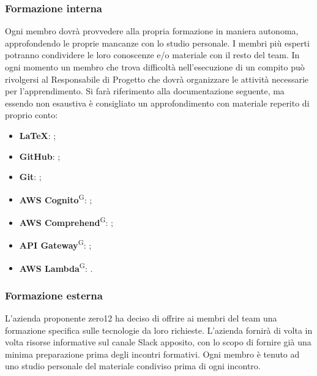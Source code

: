 \subsubsection{Formazione interna}
Ogni membro dovrà provvedere alla propria formazione in maniera autonoma, approfondendo le proprie mancanze con lo studio personale. I membri più esperti potranno condividere le loro conoscenze e/o materiale con il resto del team. In ogni momento un membro che trova difficoltà nell'esecuzione di un compito può rivolgersi al Responsabile di Progetto che dovrà organizzare le attività necessarie per l'apprendimento. Si farà riferimento alla documentazione seguente, ma essendo non esaustiva è consigliato un approfondimento con materiale reperito di proprio conto:
\begin{itemize}
\item \textbf{\LaTeX}: ;
\item \textbf{GitHub}: ;
\item \textbf{Git}: ;
\item \textbf{AWS Cognito}\textsuperscript{G}: ;
\item \textbf{AWS Comprehend}\textsuperscript{G}: ;
\item \textbf{API Gateway}\textsuperscript{G}: ;
\item \textbf{AWS Lambda}\textsuperscript{G}: .
\end{itemize}

\subsubsection{Formazione esterna}
L'azienda proponente zero12 ha deciso di offrire ai membri del team una formazione specifica sulle tecnologie da loro richieste. L'azienda fornirà di volta in volta risorse informative sul canale Slack apposito, con lo scopo di fornire già una minima preparazione prima degli incontri formativi. Ogni membro è tenuto ad uno studio personale del materiale condiviso prima di ogni incontro.


